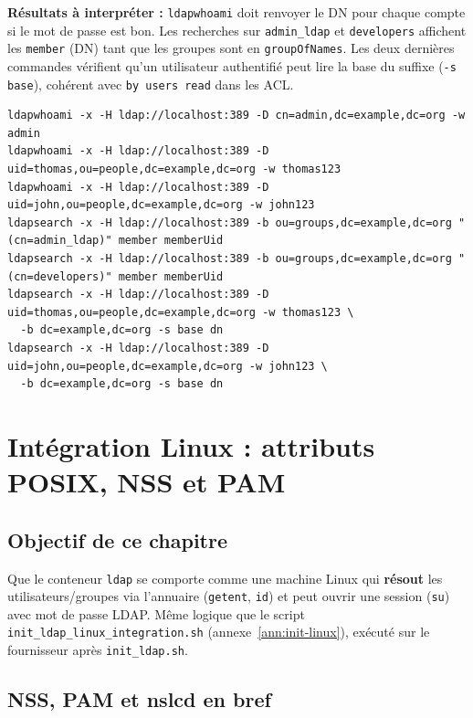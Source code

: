 \documentclass[11pt,a4paper]{report}
\begin{document}
\textbf{Résultats à interpréter :} \texttt{ldapwhoami} doit renvoyer le DN pour chaque compte si le mot de passe est bon. Les recherches sur \texttt{admin\_ldap} et \texttt{developers} affichent les \texttt{member} (DN) tant que les groupes sont en \texttt{groupOfNames}. Les deux dernières commandes vérifient qu'un utilisateur authentifié peut lire la base du suffixe (\texttt{-s base}), cohérent avec \texttt{by users read} dans les ACL.

\begin{lstlisting}[style=bashstyle]
ldapwhoami -x -H ldap://localhost:389 -D cn=admin,dc=example,dc=org -w admin
ldapwhoami -x -H ldap://localhost:389 -D uid=thomas,ou=people,dc=example,dc=org -w thomas123
ldapwhoami -x -H ldap://localhost:389 -D uid=john,ou=people,dc=example,dc=org -w john123
ldapsearch -x -H ldap://localhost:389 -b ou=groups,dc=example,dc=org "(cn=admin_ldap)" member memberUid
ldapsearch -x -H ldap://localhost:389 -b ou=groups,dc=example,dc=org "(cn=developers)" member memberUid
ldapsearch -x -H ldap://localhost:389 -D uid=thomas,ou=people,dc=example,dc=org -w thomas123 \
  -b dc=example,dc=org -s base dn
ldapsearch -x -H ldap://localhost:389 -D uid=john,ou=people,dc=example,dc=org -w john123 \
  -b dc=example,dc=org -s base dn
\end{lstlisting}

\chapter{Intégration Linux : attributs POSIX, NSS et PAM}

\section{Objectif de ce chapitre}

Que le conteneur \texttt{ldap} se comporte comme une machine Linux qui \textbf{résout} les utilisateurs/groupes via l'annuaire (\texttt{getent}, \texttt{id}) et peut ouvrir une session (\texttt{su}) avec mot de passe LDAP. Même logique que le script \texttt{init\_ldap\_linux\_integration.sh} (annexe~\ref{ann:init-linux}), exécuté sur le fournisseur après \texttt{init\_ldap.sh}.

\section{NSS, PAM et nslcd en bref}
\end{document}
